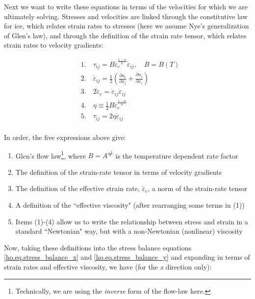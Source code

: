 Next we want to write these equations in terms of the velocities for which we are ultimately solving. Stresses and velocities are linked through the 
constitutive law for ice, which relates strain rates to stresses (here we assume Nye's generalization of Glen's law), and through the 
definition of the strain rate tensor, which relates strain rates to velocity gradients:

\begin{equation}
  \begin{split}
    & 1.\quad \tau _{ij}=B\dot{\varepsilon }_{e}^{\frac{1-n}{n}}\dot{\varepsilon }_{ij},\quad B=B(T) \\ 
    & 2.\quad \dot{\varepsilon }_{ij}=\frac{1}{2}\left( \frac{\partial u_{i}}{\partial x_{j}}+\frac{\partial u_{j}}{\partial x_{i}} \right) \\ 
    & 3.\quad 2\dot{\varepsilon }_{e}=\dot{\varepsilon }_{ij}\dot{\varepsilon }_{ij} \\ 
    & 4.\quad \eta \equiv \frac{1}{2}B\dot{\varepsilon }_{e}^{\frac{1-n}{n}} \\ 
    & 5.\quad \tau _{ij}=2\eta \dot{\varepsilon }_{ij} \\ 
  \end{split}
\end{equation}

\noindent
In order, the five expressions above give: 

\begin{enumerate}
\item  Glen's flow law\footnote{Technically, we are using the \textit{inverse} form of the flow-law here.}, where 
$B = A^{\frac{-1}{n}}$ is the temperature dependent rate factor 
\item  The definition of the strain-rate tensor in terms of velocity gradients
\item  The definition of the effective strain rate, $\dot{\varepsilon }_{e}$, a norm of the strain-rate tensor
\item  A definition of the ``effective viscosity" (after rearranging some terms in (1))
\item  Items (1)-(4) allow us to write the relationship between stress and strain in a standard ``Newtonian" way, but with a non-Newtonian (nonlinear) viscosity
\end{enumerate}

\noindent
Now, taking these definitions into the stress balance equations \eqref{ho.eq.stress_balance_x} and \eqref{ho.eq.stress_balance_y} 
and expanding in terms of strain rates and effective viscosity, we have (for the \textit{x} direction only):

